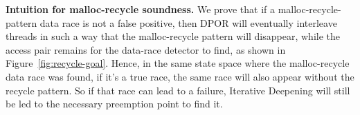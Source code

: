 {\bf Intuition for malloc-recycle soundness.}
We prove that if a malloc-recycle-pattern data race is not a false positive, %
then DPOR %
will eventually interleave threads in such a way that the malloc-recycle pattern will disappear,
while the access pair remains for the data-race detector to find, as shown in Figure~\ref{fig:recycle-goal}.
Hence, in the same state space where the malloc-recycle data race was found, if it's a true race, the same race will also appear without the recycle pattern.
So if that race can lead to a failure, Iterative Deepening will still be led to the necessary preemption point to find it.
